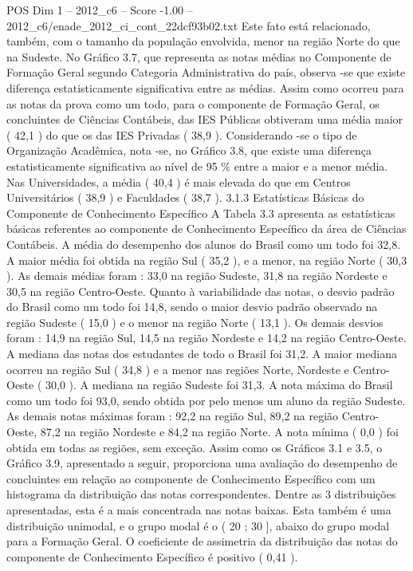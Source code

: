 \begin{textsample}{POS Dim 1 – 2012\_c6 – Score -1.00 – 2012\_c6/enade\_2012\_ci\_cont\_22dcf93b02.txt}
Este fato está relacionado, também, com o tamanho da população envolvida, menor na região Norte do que na Sudeste.
No Gráfico 3.7, que representa as notas médias no Componente de Formação Geral segundo Categoria Administrativa do país, observa -se que existe diferença estatisticamente significativa entre as médias.
Assim como ocorreu para as notas da prova como um todo, para o componente de Formação Geral, os concluintes de Ciências Contábeis, das IES Públicas obtiveram uma média maior ( 42,1 ) do que os das IES Privadas ( 38,9 ).
Considerando -se o tipo de Organização Acadêmica, nota -se, no Gráfico 3.8, que existe uma diferença estatisticamente significativa ao nível de 95 \% entre a maior e a menor média.
Nas Universidades, a média ( 40,4 ) é mais elevada do que em Centros Universitários ( 38,9 ) e Faculdades ( 38,7 ). 3.1.3 Estatísticas Básicas do Componente de Conhecimento Específico A Tabela 3.3 apresenta as estatísticas básicas referentes ao componente de Conhecimento Específico da área de Ciências Contábeis.
A média do desempenho dos alunos do Brasil como um todo foi 32,8.
A maior média foi obtida na região Sul ( 35,2 ), e a menor, na região Norte ( 30,3 ).
As demais médias foram : 33,0 na região Sudeste, 31,8 na região Nordeste e 30,5 na região Centro-Oeste.
Quanto à variabilidade das notas, o desvio padrão do Brasil como um todo foi 14,8, sendo o maior desvio padrão observado na região Sudeste ( 15,0 ) e o menor na região Norte ( 13,1 ).
Os demais desvios foram : 14,9 na região Sul, 14,5 na região Nordeste e 14,2 na região Centro-Oeste.
A mediana das notas dos estudantes de todo o Brasil foi 31,2.
A maior mediana ocorreu na região Sul ( 34,8 ) e a menor nas regiões Norte, Nordeste e Centro-Oeste ( 30,0 ).
A mediana na região Sudeste foi 31,3.
A nota máxima do Brasil como um todo foi 93,0, sendo obtida por pelo menos um aluno da região Sudeste.
As demais notas máximas foram : 92,2 na região Sul, 89,2 na região Centro-Oeste, 87,2 na região Nordeste e 84,2 na região Norte.
A nota mínima ( 0,0 ) foi obtida em todas as regiões, sem exceção.
Assim como os Gráficos 3.1 e 3.5, o Gráfico 3.9, apresentado a seguir, proporciona uma avaliação do desempenho de concluintes em relação ao componente de Conhecimento Específico com um histograma da distribuição das notas correspondentes.
Dentre as 3 distribuições apresentadas, esta é a mais concentrada nas notas baixas.
Esta também é uma distribuição unimodal, e o grupo modal é o ( 20 ; 30 ], abaixo do grupo modal para a Formação Geral.
O coeficiente de assimetria da distribuição das notas do componente de Conhecimento Específico é positivo ( 0,41 ).

\end{textsample}
